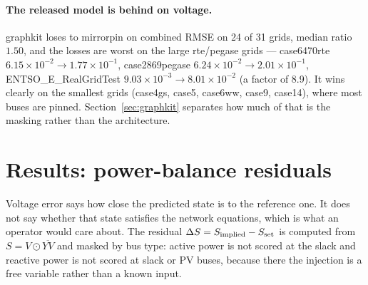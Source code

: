 \documentclass[10pt]{article}
\begin{document}
\paragraph{The released model is behind on voltage.} graphkit loses to
mirrorpin on combined RMSE on 24 of 31 grids, median ratio $1.50$, and the
losses are worst on the large rte/pegase grids --- case6470rte
$6.15\times10^{-2}\rightarrow1.77\times10^{-1}$, case2869pegase
$6.24\times10^{-2}\rightarrow2.01\times10^{-1}$, ENTSO\_E\_RealGridTest
$9.03\times10^{-3}\rightarrow8.01\times10^{-2}$ (a factor of 8.9). It wins
clearly on the smallest grids (case4gs, case5, case6ww, case9, case14), where
most buses are pinned. Section~\ref{sec:graphkit} separates how much of that is
the masking rather than the architecture.

\section{Results: power-balance residuals}

Voltage error says how close the predicted state is to the reference one. It
does not say whether that state satisfies the network equations, which is what
an operator would care about. The residual
$\Delta S = S_{\rm implied} - S_{\rm set}$ is computed from
$S = V\odot\overline{YV}$ and masked by bus type: active power is not scored at
the slack and reactive power is not scored at slack or PV buses, because there
the injection is a free variable rather than a known input.
\end{document}
